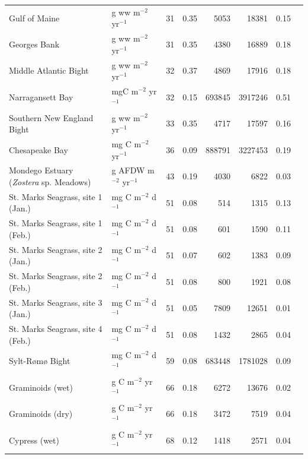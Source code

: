 \documentclass[11pt]{article}
\begin{document}
\begin{table}[ht]
\begin{center}
\begin{tiny}
\begin{tabular}{llrrrrrr}
      Gulf of Maine & g ww m$^{-2}$ yr$^{-1}$  &  31 & 0.35 & 5053 & 18381 & 0.15 &   \citet{link08} \\ 
      Georges Bank & g ww m$^{-2}$ yr$^{-1}$  &  31 & 0.35 & 4380 & 16889 & 0.18 &  \citet{link08} \\ 
      Middle Atlantic Bight & g ww m$^{-2}$ yr$^{-1}$  &  32 & 0.37 & 4869 & 17916 & 0.18 &  \citet{link08} \\ 
      Narragansett Bay & mgC m$^{-2}$ yr$^{-1}$  &  32 & 0.15 & 693845 & 3917246 & 0.51 &  \citet{monaco97} \\ 
      Southern New England Bight & g ww m$^{-2}$ yr$^{-1}$  &  33 & 0.35 & 4717 & 17597 & 0.16 &  \citet{link08} \\ 
      Chesapeake Bay  & mg C m$^{-2}$ yr$^{-1}$  &  36 & 0.09 & 888791 & 3227453 & 0.19 &  \citet{baird89} \\ 
      Mondego Estuary (\textit{Zostera} sp. Meadows) & g AFDW m$^{−2}$ yr$^{−1}$ &  43 & 0.19 & 4030 & 6822 & 0.03 & \citet{patricio2006mass} \\ 
      St. Marks Seagrass, site 1 (Jan.) & mg C m$^{-2}$ d$^{-1}$  &  51 & 0.08 & 514 & 1315 & 0.13 &  \citet{baird98} \\ 
      St. Marks Seagrass, site 1 (Feb.) & mg C m$^{-2}$ d$^{-1}$  &  51 & 0.08 & 601 & 1590 & 0.11 &  \citet{baird98} \\ 
      St. Marks Seagrass, site 2 (Jan.) & mg C m$^{-2}$ d$^{-1}$  &  51 & 0.07 & 602 & 1383 & 0.09 &  \citet{baird98} \\ 
      St. Marks Seagrass, site 2 (Feb.) & mg C m$^{-2}$ d$^{-1}$  &  51 & 0.08 & 800 & 1921 & 0.08 &  \citet{baird98} \\ 
      St. Marks Seagrass, site 3 (Jan.) & mg C m$^{-2}$ d$^{-1}$  &  51 & 0.05 & 7809 & 12651 & 0.01 & \citet{baird98} \\ 
      St. Marks Seagrass, site 4 (Feb.) & mg C m$^{-2}$ d$^{-1}$  &  51 & 0.08 & 1432 & 2865 & 0.04 &  \citet{baird98} \\ 
      Sylt-R{\o}m{\o} Bight & mg C m$^{-2}$ d$^{-1}$  &  59 & 0.08 & 683448 & 1781028 & 0.09 &  \citet{baird04_sylt} \\ 
      Graminoids (wet) & g C m$^{-2}$ yr$^{-1}$  &  66 & 0.18 & 6272 & 13676 & 0.02 &  \citet{ulanowicz00_graminoids} \\ 
      Graminoids (dry) & g C m$^{-2}$ yr$^{-1}$  &  66 & 0.18 & 3472 & 7519 & 0.04 &   \citet{ulanowicz00_graminoids} \\ 
      Cypress (wet) & g C m$^{-2}$ yr$^{-1}$  &  68 & 0.12 & 1418 & 2571 & 0.04 &  \citet{ulanowicz97_cypress} \\ 

\end{tabular}
\end{tiny}
\end{center}
\end{table}
\end{document}
